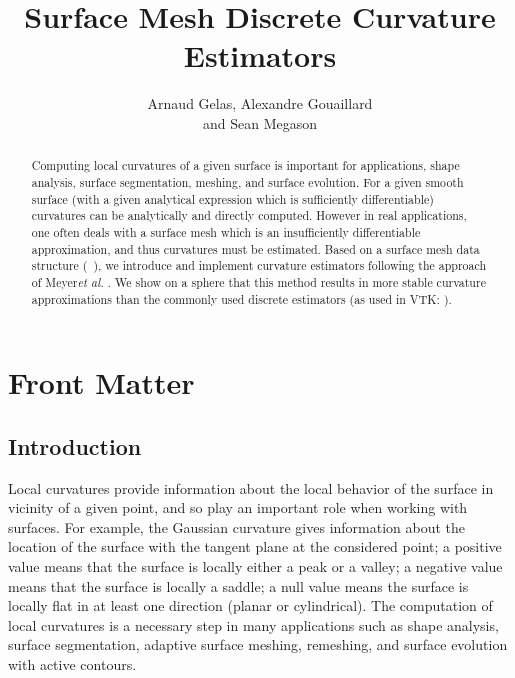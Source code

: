 \documentclass{InsightArticle}
\title{Surface Mesh Discrete Curvature Estimators}
\author{Arnaud Gelas, Alexandre Gouaillard\\
and Sean Megason}
\def \etal {\textit{et al. }}
\theoremstyle{plain}
\begin{document}
\ifpdf
\else
\fi


\maketitle


\ifhtml
\chapter*{Front Matter\label{front}}
\fi


\begin{abstract}
\noindent Computing local curvatures of a given surface is important for applications, shape analysis, surface segmentation, meshing, and surface evolution. For a given smooth surface (with a given analytical expression which is sufficiently differentiable) curvatures can be analytically and directly computed. However in real applications, one often deals with a surface mesh which is an insufficiently differentiable approximation, and thus curvatures must be estimated. Based on a surface mesh data structure (~\cite{itkQE}), we introduce and implement curvature estimators following the approach of Meyer\etal\cite{Meyer02}. We show on a sphere that this method results in more stable curvature approximations than the commonly used discrete estimators (as used in VTK: ).
\end{abstract}

\tableofcontents

\section{Introduction}

Local curvatures provide information about the local behavior of the surface in vicinity of a given point, and so play an important role when working with surfaces. For example, the Gaussian curvature gives information about the location of the surface with the tangent plane at the considered point; a positive value means that the surface is locally either a peak or a valley; a negative value means that the surface is locally a saddle; a null value means the surface is locally flat in at least one direction (planar or cylindrical). The computation of local curvatures is a necessary step in many applications such as shape analysis, surface segmentation, adaptive surface meshing, remeshing, and surface evolution with active contours.
\end{document}
